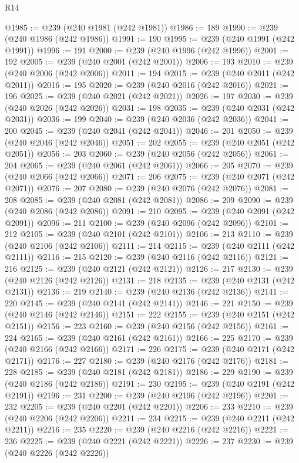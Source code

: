 \begin{lexlean}{R14}
\begin{coremodule}
{{{{{{{{{{{{{{{{{{{{{{{{{{{{{{{{{{{{{{{{{{{{{{{{{{{{{{{{{{{{{{{{{{{{{{{{{{{{{{{{{{{{{{{{{{{{{{{{{{{{{{{{{{@1985 := @239 (@240 @1981 (@242 @1981))
@1986 := 189
@1990 := @239 (@240 @1986 (@242 @1986))
@1991 := 190
@1995 := @239 (@240 @1991 (@242 @1991))
@1996 := 191
@2000 := @239 (@240 @1996 (@242 @1996))
@2001 := 192
@2005 := @239 (@240 @2001 (@242 @2001))
@2006 := 193
@2010 := @239 (@240 @2006 (@242 @2006))
@2011 := 194
@2015 := @239 (@240 @2011 (@242 @2011))
@2016 := 195
@2020 := @239 (@240 @2016 (@242 @2016))
@2021 := 196
@2025 := @239 (@240 @2021 (@242 @2021))
@2026 := 197
@2030 := @239 (@240 @2026 (@242 @2026))
@2031 := 198
@2035 := @239 (@240 @2031 (@242 @2031))
@2036 := 199
@2040 := @239 (@240 @2036 (@242 @2036))
@2041 := 200
@2045 := @239 (@240 @2041 (@242 @2041))
@2046 := 201
@2050 := @239 (@240 @2046 (@242 @2046))
@2051 := 202
@2055 := @239 (@240 @2051 (@242 @2051))
@2056 := 203
@2060 := @239 (@240 @2056 (@242 @2056))
@2061 := 204
@2065 := @239 (@240 @2061 (@242 @2061))
@2066 := 205
@2070 := @239 (@240 @2066 (@242 @2066))
@2071 := 206
@2075 := @239 (@240 @2071 (@242 @2071))
@2076 := 207
@2080 := @239 (@240 @2076 (@242 @2076))
@2081 := 208
@2085 := @239 (@240 @2081 (@242 @2081))
@2086 := 209
@2090 := @239 (@240 @2086 (@242 @2086))
@2091 := 210
@2095 := @239 (@240 @2091 (@242 @2091))
@2096 := 211
@2100 := @239 (@240 @2096 (@242 @2096))
@2101 := 212
@2105 := @239 (@240 @2101 (@242 @2101))
@2106 := 213
@2110 := @239 (@240 @2106 (@242 @2106))
@2111 := 214
@2115 := @239 (@240 @2111 (@242 @2111))
@2116 := 215
@2120 := @239 (@240 @2116 (@242 @2116))
@2121 := 216
@2125 := @239 (@240 @2121 (@242 @2121))
@2126 := 217
@2130 := @239 (@240 @2126 (@242 @2126))
@2131 := 218
@2135 := @239 (@240 @2131 (@242 @2131))
@2136 := 219
@2140 := @239 (@240 @2136 (@242 @2136))
@2141 := 220
@2145 := @239 (@240 @2141 (@242 @2141))
@2146 := 221
@2150 := @239 (@240 @2146 (@242 @2146))
@2151 := 222
@2155 := @239 (@240 @2151 (@242 @2151))
@2156 := 223
@2160 := @239 (@240 @2156 (@242 @2156))
@2161 := 224
@2165 := @239 (@240 @2161 (@242 @2161))
@2166 := 225
@2170 := @239 (@240 @2166 (@242 @2166))
@2171 := 226
@2175 := @239 (@240 @2171 (@242 @2171))
@2176 := 227
@2180 := @239 (@240 @2176 (@242 @2176))
@2181 := 228
@2185 := @239 (@240 @2181 (@242 @2181))
@2186 := 229
@2190 := @239 (@240 @2186 (@242 @2186))
@2191 := 230
@2195 := @239 (@240 @2191 (@242 @2191))
@2196 := 231
@2200 := @239 (@240 @2196 (@242 @2196))
@2201 := 232
@2205 := @239 (@240 @2201 (@242 @2201))
@2206 := 233
@2210 := @239 (@240 @2206 (@242 @2206))
@2211 := 234
@2215 := @239 (@240 @2211 (@242 @2211))
@2216 := 235
@2220 := @239 (@240 @2216 (@242 @2216))
@2221 := 236
@2225 := @239 (@240 @2221 (@242 @2221))
@2226 := 237
@2230 := @239 (@240 @2226 (@242 @2226))
}}}}}}}}}}}}}}}}}}}}}}}}}}}}}}}}}}}}}}}}}}}}}}}}}}}}}}}}}}}}}}}}}}}}}}}}}}}}}}}}}}}}}}}}}}}}}}}}}}}}}}}}}}
\end{coremodule}
\end{lexlean}
